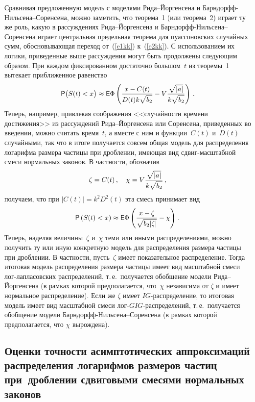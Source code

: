 \begin{multicols}{2}
Сравнивая предложенную модель с моделями Рида--Йоргенсена и
Барндорфф-Нильсена--Со\-рен\-се\-на, можно заметить, что теорема~1 (или\linebreak
теорема~2) играет ту же роль, какую в рассуждениях
Рида--Йоргенсена и Барндорфф-Нильсена--Соренсена играет
центральная предельная теорема для пуассоновских случайных сумм,
обосновывающая переход от~(\ref{e1kk}) к~(\ref{e2kk}). С использованием их логики,
приведенные выше рассуждения могут быть продолжены следующим
образом. При каждом фиксированном достаточно большом~$t$ из
теоремы~1 вытекает приближенное равенство
\begin{equation}
{\sf P}\big(S(t)<x\big)\approx{\sf
E}\Phi\left(\displaystyle\frac{\displaystyle x-C(t)\mathstrut}{\displaystyle D(t)k\sqrt{b_2}\mathstrut}-V\displaystyle\frac{\displaystyle \sqrt{|a|}\mathstrut}{\displaystyle k\sqrt{b_2}\mathstrut}\right)\,.
\label{e6kk}
\end{equation}
Теперь, например, привлекая соображения <<случайности времени
достижения>> из рассуждений Рида--Йоргенсена или Соренсена,
приведенных во введении, можно считать время~$t$, а вместе с ним и
функции~$C(t)$ и~$D(t)$ случайными, так что в итоге получается
совсем общая модель для распределения логарифма размера частицы
при дроблении, имеющая вид сдвиг-масштабной смеси нормальных
законов. В частности, обозначив
$$\zeta=C(t)\,,\quad \chi=V \displaystyle\frac{\displaystyle \sqrt{|a|}\mathstrut}{\displaystyle k\sqrt{b_2}\mathstrut}\,,
$$
получаем, что при $|C(t)|=k^2D^2(t)$
эта смесь принимает вид
$$
{\sf P}\left(S(t)<x\right)\approx{\sf
E}\Phi\left(\displaystyle\frac{\displaystyle x-\zeta\mathstrut}{\displaystyle \sqrt{b_2|\zeta|}\mathstrut}-\chi\right)\,.
$$
Теперь, наделяя величины~$\zeta$ и~$\chi$ теми или иными
распределениями, можно получить ту или иную конкретную модель для
распределения размера час\-ти\-цы при дроблении. В частности, пусть~$\zeta$
имеет показательное распределение. Тогда итоговая модель
распределения размера частицы имеет\linebreak
 вид масштабной смеси
лог-лапласовских распределений, т.\,е.\ получается обобщение
модели Рида--Йоргенсена (в рамках которой предполагается,
что~$\chi$ независима от $\zeta$ и имеет нормальное распределение).
Если же $\zeta$ имеет $IG$-распределение, то итоговая модель имеет
вид масштабной смеси лог-$GIG$-рас\-пре\-де\-ле\-ний, т.\,е.\ получается
обобщение модели Барн\-дорфф-Нильсена--Соренсена (в рамках которой
предполагается, что $\chi$ вы\-рож\-дена).
{

}

\subsection{Оценки точности асимптотических аппроксимаций распределения
логарифмов размеров частиц при~дроблении сдвиговыми смесями
нормальных законов}


\end{multicols}
